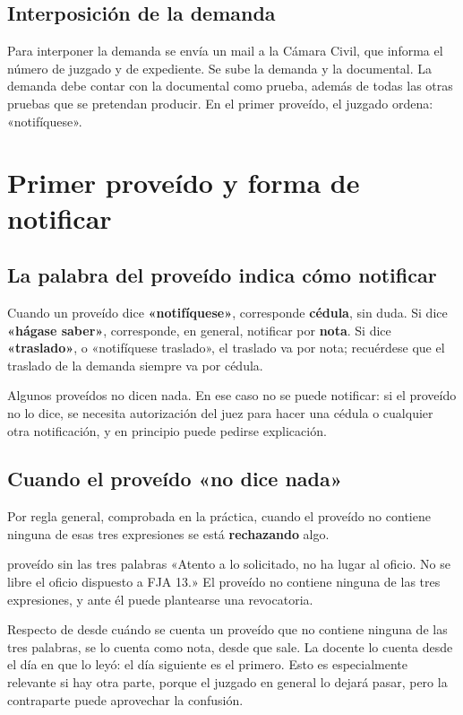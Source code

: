 \documentclass[12pt,oneside]{book}
\begin{document}
\subsection{Interposición de la demanda}

Para interponer la demanda se envía un mail a la Cámara Civil, que informa el número de juzgado y de expediente. Se sube la demanda y la documental. La demanda debe contar con la documental como prueba, además de todas las otras pruebas que se pretendan producir. En el primer proveído, el juzgado ordena: «notifíquese».

\section[Primer proveído y forma de notificar]{Primer proveído y forma de notificar}

\subsection{La palabra del proveído indica cómo notificar}

Cuando un proveído dice \textbf{«notifíquese»}, corresponde \textbf{cédula}, sin duda. Si dice \textbf{«hágase saber»}, corresponde, en general, notificar por \textbf{nota}. Si dice \textbf{«traslado»}, o «notifíquese traslado», el traslado va por nota; recuérdese que el traslado de la demanda siempre va por cédula.

Algunos proveídos no dicen nada. En ese caso no se puede notificar: si el proveído no lo dice, se necesita autorización del juez para hacer una cédula o cualquier otra notificación, y en principio puede pedirse explicación.

\subsection{Cuando el proveído «no dice nada»}

Por regla general, comprobada en la práctica, cuando el proveído no contiene ninguna de esas tres expresiones se está \textbf{rechazando} algo.

\begin{example}{proveído sin las tres palabras}
«Atento a lo solicitado, no ha lugar al oficio. No se libre el oficio dispuesto a FJA 13.» El proveído no contiene ninguna de las tres expresiones, y ante él puede plantearse una revocatoria.
\end{example}

Respecto de desde cuándo se cuenta un proveído que no contiene ninguna de las tres palabras, se lo cuenta como nota, desde que sale. La docente lo cuenta desde el día en que lo leyó: el día siguiente es el primero. Esto es especialmente relevante si hay otra parte, porque el juzgado en general lo dejará pasar, pero la contraparte puede aprovechar la confusión.
\end{document}
